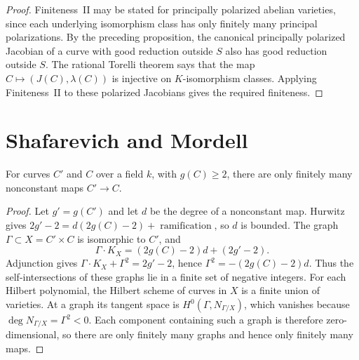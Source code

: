 \begin{proof}

Finiteness~II may be stated for principally polarized abelian varieties, since
each underlying isomorphism class has only finitely many principal
polarizations.  By the preceding proposition, the canonical principally
polarized Jacobian of a curve with good reduction outside $S$ also has good
reduction outside $S$.  The rational Torelli theorem says that the map
$C\mapsto(J(C),\lambda(C))$ is injective on $K$-isomorphism classes.  Applying
Finiteness~II to these polarized Jacobians gives the required finiteness.

\end{proof}


\section{Shafarevich and Mordell}

\begin{theorem}
\label{thm:milne-de-franchis}

For curves $C'$ and $C$ over a field $k$, with $g(C)\ge2$, there are only
finitely many nonconstant maps $C'\to C$.
\end{theorem}

\begin{proof}

Let $g'=g(C')$ and let $d$ be the degree of a nonconstant map.  Hurwitz gives
$2g'-2=d(2g(C)-2)+\operatorname{ramification}$, so $d$ is bounded.  The graph
$\Gamma\subset X=C'\times C$ is isomorphic to $C'$, and
\[
\Gamma\cdot K_X=(2g(C)-2)d+(2g'-2).
\]
Adjunction gives $\Gamma\cdot K_X+\Gamma^2=2g'-2$, hence
$\Gamma^2=-(2g(C)-2)d$.  Thus the self-intersections of these graphs lie in a
finite set of negative integers.  For each Hilbert polynomial, the Hilbert
scheme of curves in $X$ is a finite union of varieties.  At a graph its
tangent space is $H^0(\Gamma,N_{\Gamma/X})$, which vanishes because
$\deg N_{\Gamma/X}=\Gamma^2<0$.  Each component containing such a graph is
therefore zero-dimensional, so there are only finitely many graphs and hence
only finitely many maps.

\end{proof}


